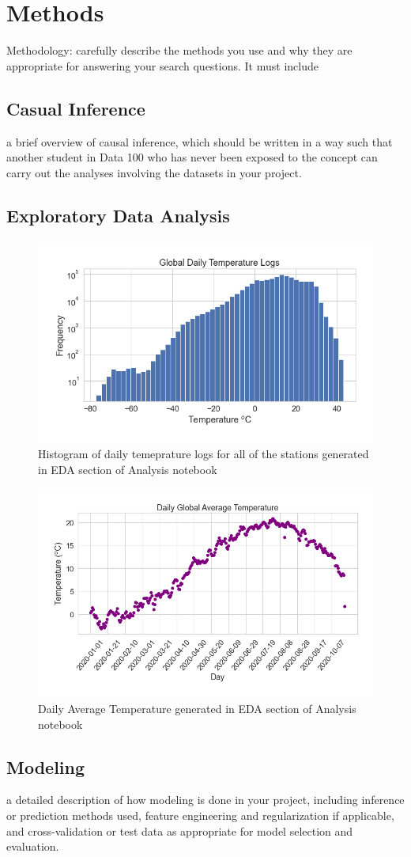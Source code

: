 \section{Methods}
Methodology: carefully describe the methods you use and why they are appropriate for answering your search questions. It must include
\subsection{Casual Inference}
a brief overview of causal inference, which should be written in a way such that another student in Data 100 who has never been exposed to the concept can carry out the analyses involving the datasets in your project.
\subsection{Exploratory Data Analysis}

\begin{figure}
    \centering
    \includegraphics[width=\columnwidth]{figures/DailyTempHist.png}
    \caption{Histogram of daily temeprature logs for all of the stations generated in EDA section of Analysis notebook}
    \label{fig:my_label}
\end{figure}

\begin{figure}
    \centering
    \includegraphics[width=\columnwidth]{figures/DailyAveTemp.png}
    \caption{Daily Average Temperature generated in EDA section of Analysis notebook}
    \label{fig:my_label}
\end{figure}


\subsection{Modeling}
a detailed description of how modeling is done in your project, including inference or prediction methods used, feature engineering and regularization if applicable, and cross-validation or test data as appropriate for model selection and evaluation.
